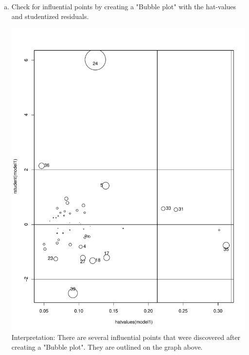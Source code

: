 \documentclass[12pt,letterpaper]{article}
\begin{document}
\begin{enumerate}[(a)]
	\item Check for influential points by creating a "Bubble plot" with the hat-values and studentized residuals.
	
	\includegraphics[width=1\textwidth, angle=0]{plot 1.4.pdf}
	Interpretation: There are several influential points that were discovered after creating a "Bubble plot". They are outlined on the graph above.
\end{enumerate}
\end{document}
